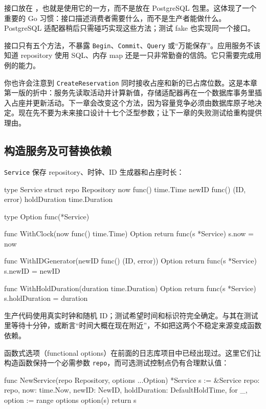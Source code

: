 接口放在 ，也就是使用它的一方，而不是放在 PostgreSQL 包里。这体现了一个重要的 Go 习惯：接口描述消费者需要什么，而不是生产者能做什么。PostgreSQL 适配器稍后只需碰巧实现这些方法；测试 fake 也实现同一个接口。

接口只有五个方法，不暴露 \texttt{Begin}、\texttt{Commit}、\texttt{Query} 或“万能保存”。应用服务不该知道 repository 使用 SQL、内存 map 还是一只非常勤奋的信鸽。它只需要完成用例的能力。

你也许会注意到 \texttt{CreateReservation} 同时接收占座和新的已占席位数。这是本章第一版的折中：服务先读取活动并计算新值，存储适配器再在一个数据库事务里插入占座并更新活动。下一章会改变这个方法，因为容量竞争必须由数据库原子地决定。现在先不要为未来接口设计十七个泛型参数；让下一章的失败测试给重构提供理由。

\subsection{构造服务及可替换依赖}

\texttt{Service} 保存 repository、时钟、ID 生成器和占座时长：

\begin{gocode}[title={代码清单 12.17 \texttt{service.go}：服务与函数式选项}]
type Service struct {
    repo         Repository
    now          func() time.Time
    newID        func() (ID, error)
    holdDuration time.Duration
}

type Option func(*Service)

func WithClock(now func() time.Time) Option {
    return func(s *Service) { s.now = now }
}

func WithIDGenerator(newID func() (ID, error)) Option {
    return func(s *Service) { s.newID = newID }
}

func WithHoldDuration(duration time.Duration) Option {
    return func(s *Service) { s.holdDuration = duration }
}
\end{gocode}

生产代码使用真实时钟和随机 ID；测试希望时间和标识符完全确定。与其在测试里等待十分钟，或断言“时间大概在现在附近”，不如把这两个不稳定来源变成函数依赖。

函数式选项（functional options）在前面的日志库项目中已经出现过。这里它们让构造函数保持一个必需参数 \texttt{repo}，而可选测试控制点仍有合理默认值：

\begin{gocode}[]
func NewService(repo Repository, options ...Option) *Service {
    s := &Service{
        repo:         repo,
        now:          time.Now,
        newID:        NewID,
        holdDuration: DefaultHoldTime,
    }
    for _, option := range options {
        option(s)
    }
    return s
}
\end{gocode}

